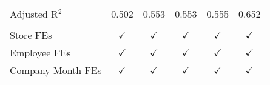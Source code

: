 \begin{tabular}{lccccc}
   Adjusted R$^2$          & 0.502         & 0.553         & 0.553         & 0.555          & 0.652\\  
    \\
   Store FEs               & $\checkmark$  & $\checkmark$  & $\checkmark$  & $\checkmark$   & $\checkmark$\\   
   Employee FEs            & $\checkmark$  & $\checkmark$  & $\checkmark$  & $\checkmark$   & $\checkmark$\\   
   Company-Month FEs       & $\checkmark$  & $\checkmark$  & $\checkmark$  & $\checkmark$   & $\checkmark$\\   
   \bottomrule
\end{tabular}
\par\endgroup



